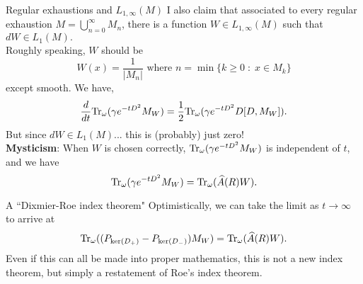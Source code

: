 \documentclass{beamer}
\numberwithin{equation}{section}
\theoremstyle{plain}
\theoremstyle{plain}
\theoremstyle{definition}
\theoremstyle{plain}
\theoremstyle{plain}
\theoremstyle{definition}
\newcommand{\tr}{{\rm Tr}}
\begin{document}
\begin{frame}{Regular exhaustions and $L_{1,\infty}(M)$}
    I also claim that associated to every regular exhaustion $M = \bigcup_{n=0}^\infty M_n$, there is a function $W \in L_{1,\infty}(M)$
    such that $dW \in L_1(M).$\\
    Roughly speaking, $W$ should be
    \begin{equation*}
        W(x) = \frac{1}{|M_n|} \text{ where } n = \min\{k\geq 0\;:\; x \in M_k\}
    \end{equation*}
    except smooth.
    \pause    
    We have,
    \begin{equation*}
        \frac{d}{dt}\tr_{\omega}(\gamma e^{-tD^2} M_W) = \frac{1}{2}\tr_{\omega}(\gamma e^{-tD^2}D[D,M_W]).
    \end{equation*}    
    But since $dW\in L_1(M)$... this is (probably) just zero!\\
    \pause
    \textbf{Mysticism}: When $W$ is chosen correctly, $\tr_{\omega}(\gamma e^{-tD^2}M_W)$ is independent of $t$, 
    and we have 
    \begin{equation*}
        \tr_{\omega}(\gamma e^{-tD^2}M_W) = \tr_{\omega}(\widehat{A}(R)W).
    \end{equation*}
\end{frame}

\begin{frame}{A ``Dixmier-Roe index theorem"}
    Optimistically, we can take the limit as $t\to \infty$ to arrive at
    \begin{equation*}
        \tr_{\omega}((P_{\ker(D_+)}-P_{\ker(D_-)})M_W) = \tr_{\omega}(\widehat{A}(R)W).
    \end{equation*}
    \pause
    Even if this can all be made into proper mathematics, this is not a new index theorem, but simply a restatement of Roe's index theorem.
\end{frame}

\begin{frame}
\end{frame}
\end{document}
